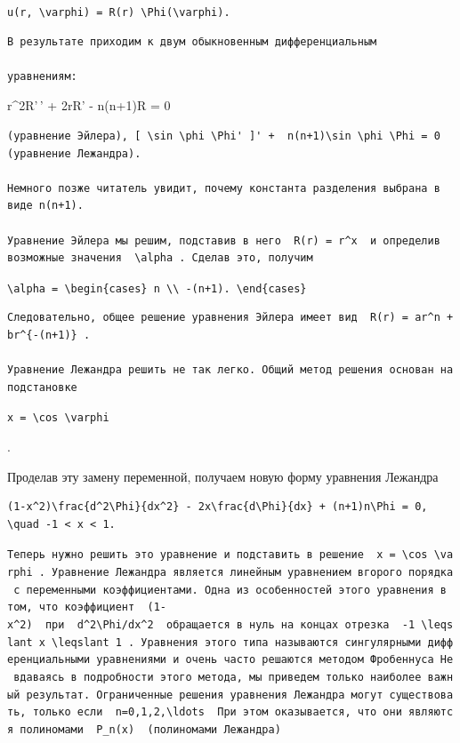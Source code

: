 \documentclass[
  ukrainian,
]{article}
\begin{document}
\texttt{u(r,\ \textbackslash{}varphi)\ =\ R(r)\ \textbackslash{}Phi(\textbackslash{}varphi).}

\begin{verbatim}
В результате приходим к двум обыкновенным дифференциальным

уравнениям:
\end{verbatim}

r\^{}2R'\,' + 2rR' - n(n+1)R = 0

\begin{verbatim}
(уравнение Эйлера), [ \sin \phi \Phi' ]' +  n(n+1)\sin \phi \Phi = 0  (уравнение Лежандра).

Немного позже читатель увидит, почему константа разделения выбрана в виде n(n+1).

Уравнение Эйлера мы решим, подставив в него  R(r) = r^x  и определив возможные значения  \alpha . Сделав это, получим
\end{verbatim}

\texttt{\textbackslash{}alpha\ =\ \textbackslash{}begin\{cases\}\ n\ \textbackslash{}\textbackslash{}\ -(n+1).\ \textbackslash{}end\{cases\}}

\begin{verbatim}
Следовательно, общее решение уравнения Эйлера имеет вид  R(r) = ar^n + br^{-(n+1)} .

Уравнение Лежандра решить не так легко. Общий метод решения основан на подстановке
\end{verbatim}

\texttt{x\ =\ \textbackslash{}cos\ \textbackslash{}varphi}

.

Проделав эту замену переменной, получаем новую форму уравнения Лежандра

\begin{verbatim}
(1-x^2)\frac{d^2\Phi}{dx^2} - 2x\frac{d\Phi}{dx} + (n+1)n\Phi = 0, \quad -1 < x < 1.
\end{verbatim}

\texttt{Теперь\ нужно\ решить\ это\ уравнение\ и\ подставить\ в\ решение\ \ \textquotesingle{}x\ =\ \textbackslash{}cos\ \textbackslash{}varphi\textquotesingle{}\ .\ Уравнение\ Лежандра\ является\ линейным\ уравнением\ вгорого\ порядка\ с\ переменными\ коэффициентами.\ Одна\ из\ особенностей\ этого\ уравнения\ в\ том,\ что\ коэффициент\ \ \textquotesingle{}(1-x\^{}2)\textquotesingle{}\ \ при\ \ \textquotesingle{}d\^{}2\textbackslash{}Phi/dx\^{}2\textquotesingle{}\ \ обращается\ в\ нуль\ на\ концах\ отрезка\ \ \textquotesingle{}-1\ \textbackslash{}leqslant\ x\ \textbackslash{}leqslant\ 1\textquotesingle{}\ .\ Уравнения\ этого\ типа\ называются\ сингулярными\ дифференциальными\ уравнениями\ и\ очень\ часто\ решаются\ методом\ Фробеннуса\ Не\ вдаваясь\ в\ подробности\ этого\ метода,\ мы\ приведем\ только\ наиболее\ важный\ результат.\ Ограниченные\ решения\ уравнения\ Лежандра\ могут\ существовать,\ только\ если\ \ \textquotesingle{}n=0,1,2,\textbackslash{}ldots\textquotesingle{}\ \ При\ этом\ оказывается,\ что\ они\ являются\ полиномами\ \ \textquotesingle{}P\_n(x)\textquotesingle{}\ \ (полиномами\ Лежандра)}
\end{document}
